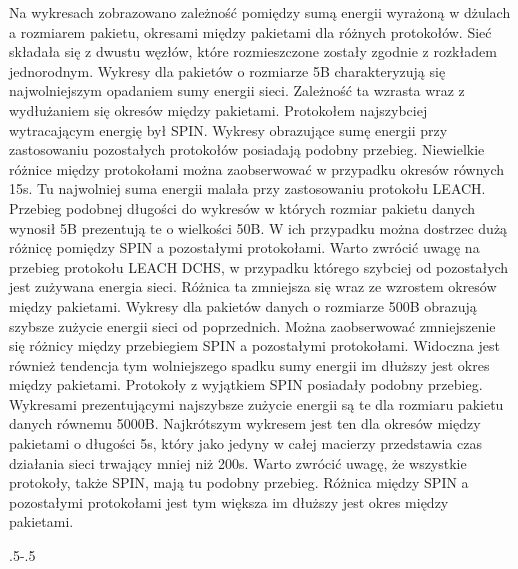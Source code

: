 Na wykresach zobrazowano zależność pomiędzy sumą energii wyrażoną w dżulach a rozmiarem pakietu, okresami między pakietami dla różnych protokołów. Sieć składała się z dwustu węzłów, które rozmieszczone zostały zgodnie z rozkładem jednorodnym.
Wykresy dla pakietów o rozmiarze 5B charakteryzują się najwolniejszym opadaniem sumy energii sieci. Zależność ta wzrasta wraz z wydłużaniem się okresów między pakietami. Protokołem najszybciej wytracającym energię był SPIN. Wykresy obrazujące sumę energii przy zastosowaniu pozostałych protokołów posiadają podobny przebieg. Niewielkie różnice między protokołami można zaobserwować w przypadku okresów równych 15s. Tu najwolniej suma energii malała przy zastosowaniu protokołu LEACH. 
Przebieg podobnej długości do wykresów w których rozmiar pakietu danych wynosił 5B prezentują te o wielkości 50B. W ich przypadku można dostrzec dużą różnicę pomiędzy SPIN a pozostałymi protokołami.  Warto zwrócić uwagę na przebieg protokołu LEACH DCHS, w przypadku którego szybciej od pozostałych jest zużywana energia sieci. Różnica ta zmniejsza się wraz ze wzrostem okresów między pakietami. 
Wykresy dla pakietów danych o rozmiarze 500B obrazują szybsze zużycie energii sieci od poprzednich.  Można zaobserwować zmniejszenie się różnicy między przebiegiem SPIN a pozostałymi protokołami. Widoczna jest również tendencja tym wolniejszego spadku sumy energii im dłuższy jest okres między pakietami. Protokoły z wyjątkiem SPIN  posiadały podobny przebieg.
Wykresami prezentującymi najszybsze zużycie energii są te dla rozmiaru pakietu danych równemu 5000B. Najkrótszym wykresem jest ten dla okresów między pakietami o długości 5s, który jako jedyny w całej macierzy przedstawia czas działania sieci trwający mniej niż 200s. Warto zwrócić uwagę, że wszystkie protokoły, także SPIN, mają tu podobny przebieg. Różnica między SPIN a pozostałymi protokołami jest tym większa im dłuższy jest okres między pakietami.


\clearpage
\thispagestyle{empty}

{\pdfpagewidth
    \vspace*{-2cm}
    \noindent\kern.5\pdfpagewidth{}\kern-.5\pdfpagewidth
     \par
     \vspace*{-5cm}
\clearpage
}
